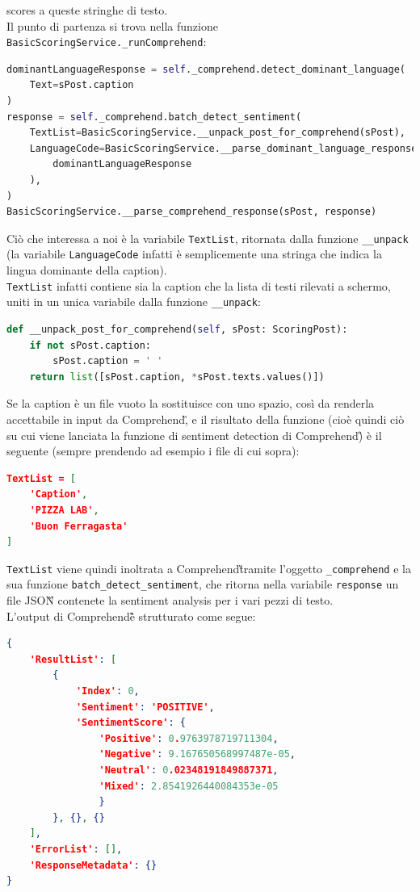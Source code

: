scores a queste stringhe di testo.\\
Il punto di partenza si trova nella funzione \verb+BasicScoringService._runComprehend+:
\begin{lstlisting}[language=Python]
dominantLanguageResponse = self._comprehend.detect_dominant_language(
    Text=sPost.caption
)
response = self._comprehend.batch_detect_sentiment(
    TextList=BasicScoringService.__unpack_post_for_comprehend(sPost),
    LanguageCode=BasicScoringService.__parse_dominant_language_response(
        dominantLanguageResponse
    ),
)
BasicScoringService.__parse_comprehend_response(sPost, response)
\end{lstlisting}
Ciò che interessa a noi è la variabile \verb+TextList+, ritornata dalla funzione \verb+__unpack+ 
(la variabile \verb+LanguageCode+ infatti è semplicemente una stringa che indica la lingua dominante della caption).\\
\verb+TextList+ infatti contiene sia la caption che la lista di testi rilevati a schermo, uniti in un
unica variabile dalla funzione \verb+__unpack+:
\begin{lstlisting}[language=Python]
def __unpack_post_for_comprehend(self, sPost: ScoringPost):
    if not sPost.caption:
        sPost.caption = ' '  
    return list([sPost.caption, *sPost.texts.values()])
\end{lstlisting}
Se la caption è un file vuoto la sostituisce con uno spazio, così da renderla accettabile in input
da Comprehend\G, e il risultato della funzione (cioè quindi ciò su cui viene lanciata la funzione di
sentiment detection di Comprehend\G) è il seguente (sempre prendendo ad esempio i file di cui sopra):
\begin{lstlisting}[language=JSON]
TextList = [
    'Caption',
    'PIZZA LAB',
    'Buon Ferragasta'
]
\end{lstlisting}
\verb+TextList+ viene quindi inoltrata a Comprehend\G tramite l'oggetto \verb+_comprehend+ e la sua
funzione \verb+batch_detect_sentiment+, che ritorna nella variabile \verb+response+ un file JSON\G{}
contenete la sentiment analysis per i vari pezzi di testo.\\
L'output di Comprehend\G è strutturato come segue:
\begin{lstlisting}[language=JSON]
{
    'ResultList': [
        {
            'Index': 0, 
            'Sentiment': 'POSITIVE', 
            'SentimentScore': {
                'Positive': 0.9763978719711304, 
                'Negative': 9.167650568997487e-05, 
                'Neutral': 0.02348191849887371, 
                'Mixed': 2.8541926440084353e-05
                }
        }, {}, {}
    ], 
    'ErrorList': [], 
    'ResponseMetadata': {}
}
\end{lstlisting}
